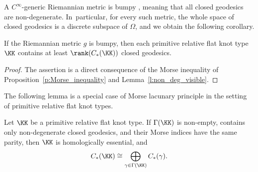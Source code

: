 A $C^\infty$-generic Riemannian metric is bumpy \cite{Anosov:1982aa}, meaning that all closed geodesics are non-degenerate. In~particular, for every such metric, the whole space of closed geodesics is a discrete subspace of $\Omega$, and we obtain the following corollary.

\begin{Cor}
If the Riemannian metric $g$ is bumpy, then each primitive relative flat knot type $\KK$ contains at least $\rank(C_*(\KK))$ closed geodesics.
\end{Cor}

\begin{proof}
The assertion is a direct consequence of the Morse inequality of Proposition~\ref{p:Morse_inequality} and Lemma~\ref{l:non_deg_visible}.
\end{proof}

The following lemma is a special case of Morse lacunary principle in the setting of primitive relative flat knot types.

\begin{Lemma}
\label{l:local_homology_parity}
Let $\KK$ be a primitive relative flat knot type. If $\Gamma(\KK)$ is non-empty, contains only non-degenerate closed geodesics, and their Morse indices have the same parity, then $\KK$ is homologically essential, and
\[
C_*(\KK) \cong \bigoplus_{\gamma\in\Gamma(\KK)} C_*(\gamma).
\]
\end{Lemma}

